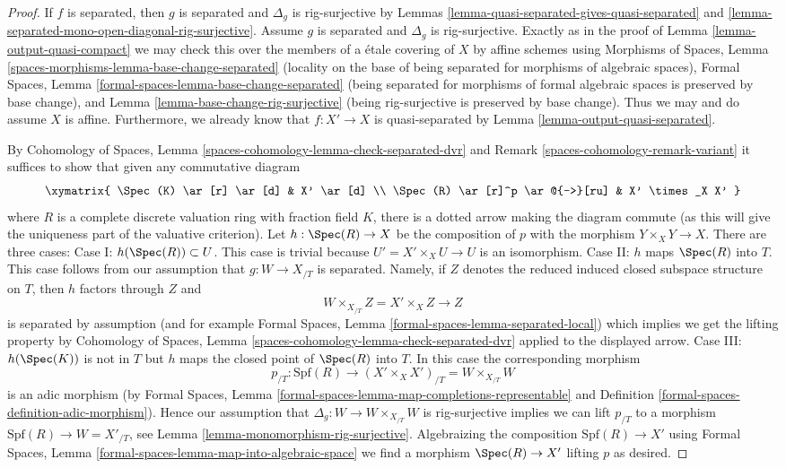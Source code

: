 \begin{proof}
If $f$ is separated, then $g$ is separated and $\Delta_g$
is rig-surjective by
Lemmas \ref{lemma-quasi-separated-gives-quasi-separated} and
\ref{lemma-separated-mono-open-diagonal-rig-surjective}.
Assume $g$ is separated and $\Delta_g$ is rig-surjective.
Exactly as in the proof of
Lemma \ref{lemma-output-quasi-compact}
we may check this over the members of a \'etale covering of $X$
by affine schemes using
Morphisms of Spaces, Lemma \ref{spaces-morphisms-lemma-base-change-separated}
(locality on the base of being separated for morphisms of algebraic spaces),
Formal Spaces, Lemma \ref{formal-spaces-lemma-base-change-separated}
(being separated for morphisms of formal algebraic spaces is preserved
by base change), and
Lemma \ref{lemma-base-change-rig-surjective} (being rig-surjective
is preserved by base change).
Thus we may and do assume $X$ is affine. Furthermore,
we already know that $f : X' \to X$ is quasi-separated by
Lemma \ref{lemma-output-quasi-separated}.

\medskip\noindent
By Cohomology of Spaces, Lemma
\ref{spaces-cohomology-lemma-check-separated-dvr} and
Remark \ref{spaces-cohomology-remark-variant}
it suffices to show that given any commutative diagram
$$
\xymatrix{
\Spec(K) \ar[r] \ar[d] & X' \ar[d] \\
\Spec(R) \ar[r]^p \ar@{-->}[ru] & X' \times_X X'
}
$$
where $R$ is a complete discrete valuation ring with fraction field $K$,
there is a dotted arrow making the diagram commute (as this will
give the uniqueness part of the valuative criterion). Let
$h : \Spec(R) \to X$ be the composition of $p$ with the morphism
$Y \times_X Y \to X$. There are three cases:
Case I: $h(\Spec(R)) \subset U$. This case is trivial
because $U' = X' \times_X U \to U$ is an isomorphism.
Case II: $h$ maps $\Spec(R)$ into $T$. This case follows
from our assumption that $g : W \to X_{/T}$ is separated. Namely,
if $Z$ denotes the reduced induced closed subspace structure
on $T$, then $h$ factors through $Z$ and
$$
W \times_{X_{/T}} Z = X' \times_X Z \longrightarrow Z
$$
is separated by assumption (and for example
Formal Spaces, Lemma \ref{formal-spaces-lemma-separated-local})
which implies we get the lifting property by
Cohomology of Spaces, Lemma \ref{spaces-cohomology-lemma-check-separated-dvr}
applied to the displayed arrow. Case III: $h(\Spec(K))$ is not in $T$
but $h$ maps the closed point of $\Spec(R)$ into $T$. In this case
the corresponding morphism
$$
p_{/T} :
\text{Spf}(R)
\longrightarrow
(X' \times_X X')_{/T} =
W \times_{X_{/T}} W
$$
is an adic morphism (by
Formal Spaces, Lemma
\ref{formal-spaces-lemma-map-completions-representable} and
Definition \ref{formal-spaces-definition-adic-morphism}).
Hence our assumption that
$\Delta_g : W \to W \times_{X_{/T}} W$ is rig-surjective implies we can lift
$p_{/T}$ to a morphism $\text{Spf}(R) \to W = X'_{/T}$, see
Lemma \ref{lemma-monomorphism-rig-surjective}.
Algebraizing the composition $\text{Spf}(R) \to X'$ using
Formal Spaces, Lemma \ref{formal-spaces-lemma-map-into-algebraic-space}
we find a morphism $\Spec(R) \to X'$ lifting $p$ as desired.
\end{proof}

